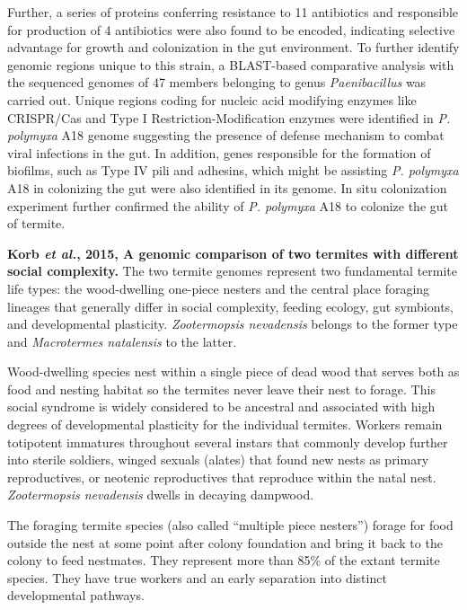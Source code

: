 \documentclass[11pt]{article}
\begin{document}
\begin{sloppypar}
Further, a series of proteins conferring resistance to 11 antibiotics and responsible for production of 4 antibiotics were also found to be encoded, indicating selective advantage for growth and colonization in the gut environment. 
To further identify genomic regions unique to this strain, a BLAST-based comparative analysis with the sequenced genomes of 47 members belonging to genus \textit{Paenibacillus} was carried out. 
Unique regions coding for nucleic acid modifying enzymes like CRISPR/Cas and Type I Restriction-Modification enzymes were identified in \textit{P. polymyxa} A18 genome suggesting the presence of defense mechanism to combat viral infections in the gut. 
In addition, genes responsible for the formation of biofilms, such as Type IV pili and adhesins, which might be assisting \textit{P. polymyxa} A18 in colonizing the gut were also identified in its genome. 
In situ colonization experiment further confirmed the ability of \textit{P. polymyxa} A18 to colonize the gut of termite. 
\par
\textbf{Korb \textit{et al.}, 2015, A genomic comparison of two termites with different social complexity.} \newline
The two termite genomes represent two fundamental termite life types: the wood-dwelling one-piece nesters and the central place foraging lineages that generally differ in social complexity, feeding ecology, gut symbionts, and developmental plasticity. 
\textit{Zootermopsis nevadensis} belongs to the former type and \textit{Macrotermes natalensis} to the latter. 
\par
Wood-dwelling species nest within a single piece of dead wood that serves both as food and nesting habitat so the termites never leave their nest to forage. 
This social syndrome is widely considered to be ancestral and associated with high degrees of developmental plasticity for the individual termites. 
Workers remain totipotent immatures throughout several instars that commonly develop further into sterile soldiers, winged sexuals (alates) that found new nests as primary reproductives, or neotenic reproductives that reproduce within the natal nest. 
\textit{Zootermopsis nevadensis} dwells in decaying dampwood. 
\par
The foraging termite species (also called “multiple piece nesters”) forage for food outside the nest at some point after colony foundation and bring it back to the colony to feed nestmates. 
They represent more than 85\% of the extant termite species. 
They have true workers and an early separation into distinct developmental pathways. 

\end{sloppypar}
\end{document}
